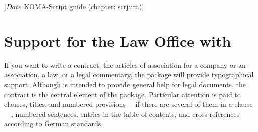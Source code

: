 %
%
%
%
%
%
%
%
% 
%
%
%
%

%
                 [$Date$
                  KOMA-Script guide (chapter: scrjura)]



\chapter{Support for the Law Office with }
\BeginIndexGroup
{}

If you want to write a contract, the articles of association
for a company or an association, a law, or a legal commentary, the package
 will provide typographical support. Although
 is intended to provide general help for legal documents, the
contract is the central element of the package. Particular attention is paid
to clauses, titles, and numbered provisions\,---\,if there are several of
them in a clause\,---, numbered sentences, entries in the table of
contents, and cross references according to German standards.

